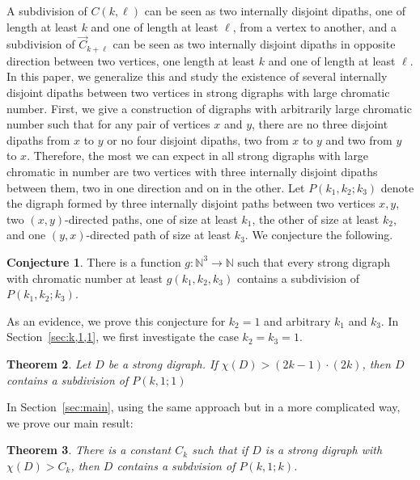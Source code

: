 \documentclass[utf8,10pt]{article}
\theoremstyle{plain}
\newtheorem{theorem}{Theorem}
\theoremstyle{definition}
\newtheorem{conjecture}[theorem]{Conjecture}
\theoremstyle{remark}
\begin{document}
A subdivision of $C(k,\ell)$ can be seen as two internally disjoint dipaths, one of length at least $k$ and one of length at least $\ell$, from a vertex to another, and a subdivision of $\vec{C}_{k+\ell}$ can be seen as two internally disjoint dipaths in opposite direction between two vertices, one length at least $k$ and one of length at least $\ell$.
In this paper, we generalize this and study the existence of several internally disjoint dipaths between two vertices in strong digraphs with large chromatic number.
First, we give a construction of digraphs with arbitrarily large chromatic number such that for any pair of vertices
$x$ and $y$, there are no three disjoint dipaths from $x$ to $y$ or no four disjoint dipaths, two from $x$ to $y$ and two from $y$ to $x$. 
Therefore, the most we can expect in all strong digraphs with large chromatic in number are two vertices with three internally disjoint dipaths between them, two in one direction and on in the other.
Let $P(k_1,k_2;k_3)$ denote the digraph formed by three internally disjoint paths between two vertices $x,y$,
two $(x,y)$-directed paths, one of size at least $k_1$, the other of size at least $k_2$, and one $(y,x)$-directed path of size at least $k_3$.
We conjecture the following.

\begin{conjecture}\label{conj:3chemins}
There is a function $g:\mathbb{N}^3 \rightarrow \mathbb{N}$ such that  every strong digraph with chromatic number at least $g(k_1,k_2,k_3)$ contains
a subdivision of $P(k_1,k_2;k_3)$.
\end{conjecture}

As an evidence, we prove this conjecture for $k_2=1$ and arbitrary $k_1$ and $k_3$. In Section~\ref{sec:k,1,1}, we first investigate the case $k_2=k_3=1$.

\begin{theorem}\label{th:P11k}
Let $D$ be a strong digraph. If $\chi(D) >  (2k-1)\cdot (2k)$, then $D$ contains a subdivision of $P(k,1;1)$
\end{theorem}

In Section~\ref{sec:main}, using the same approach but in a more complicated way, we prove our main result: 

\begin{theorem}\label{th:main}
There is a constant $C_k$ such that if $D$ is a strong digraph with $\chi(D) > C_k$, then $D$ contains a subdvision of $P(k,1;k)$.
\end{theorem}


\medskip
\end{document}

